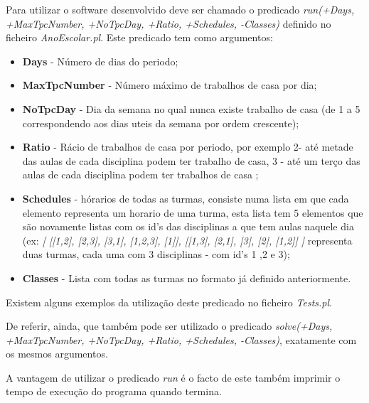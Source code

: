 \documentclass{llncs}
\begin{document}
Para utilizar o software desenvolvido deve ser chamado o predicado  \textit{run(+Days, +MaxTpcNumber, +NoTpcDay, +Ratio, +Schedules, -Classes)} definido no ficheiro \textit{AnoEscolar.pl}. Este predicado tem como argumentos:
	\begin{itemize}
			\item \textbf{Days} - Número de dias do periodo;
			\item \textbf{MaxTpcNumber} - Número máximo de trabalhos de casa por dia;
			\item \textbf{NoTpcDay} - Dia da semana no qual nunca existe trabalho de casa (de 1 a 5 correspondendo aos dias uteis da semana por ordem crescente);
			\item \textbf{Ratio} - Rácio de trabalhos de casa por periodo, por exemplo 2- até metade das aulas de cada disciplina podem ter trabalho de casa, 3 - até um terço das aulas de cada disciplina podem ter trabalhos de casa ;
			\item \textbf{Schedules} - hórarios de todas as turmas, consiste numa lista em que cada elemento representa um horario de uma turma, esta lista tem 5 elementos que são novamente listas com os id's das disciplinas a que tem aulas naquele dia (ex:  \textit{[ [[1,2], [2,3], [3,1], [1,2,3], [1]],  [[1,3], [2,1], [3], [2], [1,2]] ]} representa duas turmas, cada uma com 3 disciplinas - com id's 1 ,2 e 3); 
			\item \textbf{Classes} - Lista com todas as turmas no formato já definido anteriormente.
	\end{itemize}
Existem alguns exemplos da utilização deste predicado no ficheiro \textit{Tests.pl}.\par 
De referir, ainda, que também pode ser utilizado o predicado  \textit{solve(+Days, +MaxTpcNumber, +NoTpcDay, +Ratio, +Schedules, -Classes)}, exatamente com os mesmos argumentos.\par
A vantagem de utilizar o predicado  \textit{run} é o facto de este também imprimir o tempo de execução do programa quando termina.
\end{document}
